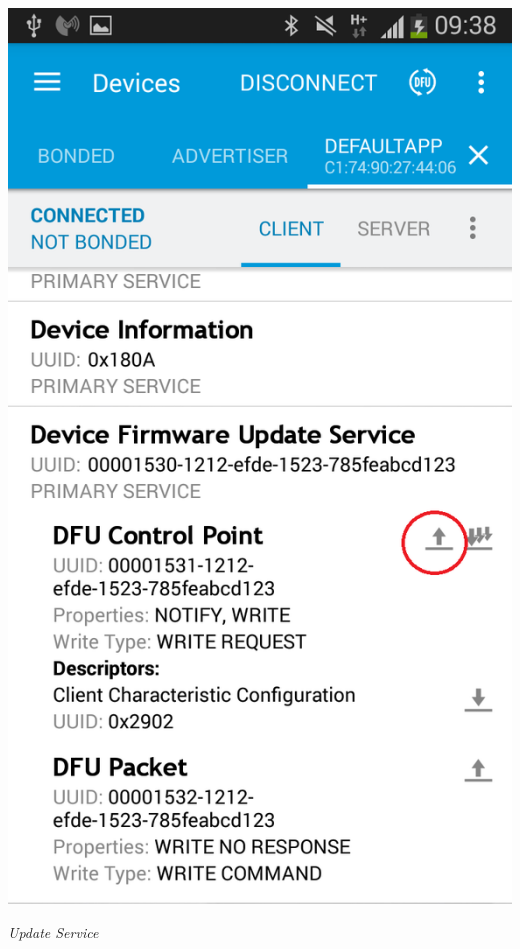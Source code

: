 \documentclass[conference]{IEEEtran}
\begin{document}
\begin{center}
    \includegraphics[scale=0.5]{FOTA2}
    \begin{minipage}{0.6\textwidth}
    \footnotesize
    \emph{Update Service}
    \end{minipage}
\end{center}
\end{document}
